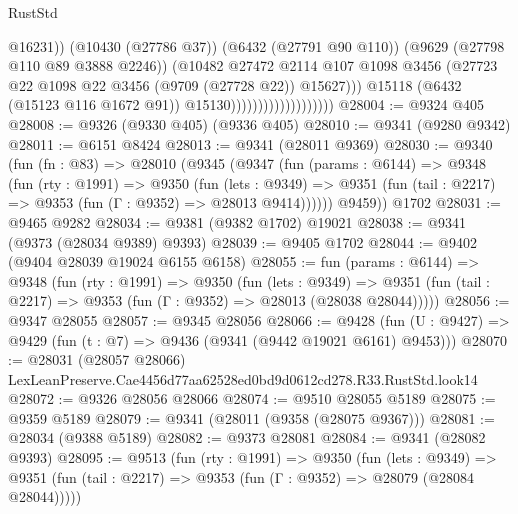 \begin{lexlean}{RustStd}
\begin{coremodule}
                                                @16231))
                                            (@10430 (@27786 @37))
                                            (@6432 (@27791 @90 @110))
                                            (@9629 (@27798 @110 @89 @3888 @2246))
                                            (@10482
                                              @27472
                                              @2114
                                              @107
                                              @1098
                                              @3456
                                              (@27723
                                                @22
                                                @1098
                                                @22
                                                @3456
                                                (@9709 (@27728 @22))
                                                @15627)))
                                          @15118
                                          (@6432 (@15123 @116 @1672 @91))
                                          @15130)))))))))))))))))))
@28004 := @9324 @405
@28008 := @9326 (@9330 @405) (@9336 @405)
@28010 := @9341 (@9280 @9342)
@28011 := @6151 @8424
@28013 := @9341 (@28011 @9369)
@28030 := @9340
    (fun (fn : @83) =>
    @28010
      (@9345
        (@9347
          (fun (params : @6144) =>
          @9348
            (fun (rty : @1991) =>
            @9350
              (fun (lets : @9349) =>
              @9351 (fun (tail : @2217) => @9353 (fun (Γ : @9352) => @28013 @9414))))))
        @9459))
    @1702
@28031 := @9465 @9282
@28034 := @9381 (@9382 @1702) @19021
@28038 := @9341 (@9373 (@28034 @9389) @9393)
@28039 := @9405 @1702
@28044 := @9402 (@9404 @28039 @19024 @6155 @6158)
@28055 := fun (params : @6144) =>
  @9348
    (fun (rty : @1991) =>
    @9350
      (fun (lets : @9349) =>
      @9351 (fun (tail : @2217) => @9353 (fun (Γ : @9352) => @28013 (@28038 @28044)))))
@28056 := @9347 @28055
@28057 := @9345 @28056
@28066 := @9428
    (fun (U : @9427) => @9429 (fun (t : @7) => @9436 (@9341 (@9442 @19021 @6161) @9453)))
@28070 := @28031
    (@28057 @28066)
    LexLeanPreserve.Cae4456d77aa62528ed0bd9d0612cd278.R33.RustStd.look14
@28072 := @9326 @28056 @28066
@28074 := @9510 @28055 @5189
@28075 := @9359 @5189
@28079 := @9341 (@28011 (@9358 (@28075 @9367)))
@28081 := @28034 (@9388 @5189)
@28082 := @9373 @28081
@28084 := @9341 (@28082 @9393)
@28095 := @9513
    (fun (rty : @1991) =>
    @9350
      (fun (lets : @9349) =>
      @9351 (fun (tail : @2217) => @9353 (fun (Γ : @9352) => @28079 (@28084 @28044)))))

\end{coremodule}
\end{lexlean}
